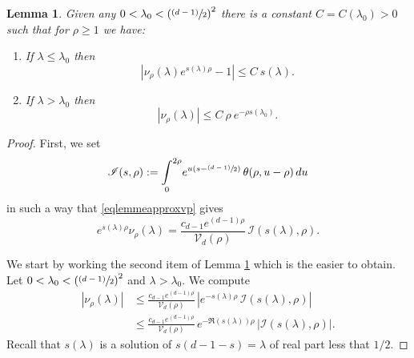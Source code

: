 \documentclass[10pt]{amsart}
\let\mathcal\mathscr
\newcommand{\psfrac}[2]{\sfrac{(#1)}{#2}}
\theoremstyle{plain}
\newtheorem{lemma}[equation]{Lemma}
\theoremstyle{definition}
\newcommand{\inte}[1]{\underset{#1}{\int}}
\begin{document}
\begin{lemma}
\label{lemmeapproxvp}
Given any $ 0 < \lambda_0 < \left(\psfrac{d-1}{2} \right)^2 $ there is a constant $C = C(\lambda_0) > 0$ such that for $\rho \ge 1$ we have:
\begin{enumerate}
\item If $\lambda \le \lambda_0$ then
\[
| \nu_{\rho}(\lambda) e^{s(\lambda) \rho} - 1 | \le C \ s(\lambda).
\]
\item If $\lambda > \lambda_0$ then
\[
|\nu_{\rho}(\lambda)| \le C \ \rho \ e^{- \rho s(\lambda_0)}.
\]
\end{enumerate}
\end{lemma}

\begin{proof}
First, we set
\[
\mathcal{I}(s,\rho) := \inte{0}^{2\rho} e^{u \left(s - \psfrac{d-1}{2} \right)}\, \theta(\rho, u-\rho) \,du
\]
in such a way that \eqref{eqlemmeapproxvp} gives
\[
e^{s(\lambda) \rho} \nu_{\rho}(\lambda) = \frac{ c_{d-1} e^{(d-1)\rho}} {\mathcal{V}_d(\rho)} \, \mathcal{I}(s(\lambda),\rho).
\]

We start by working the second item of Lemma \ref{lemmeapproxvp} which is the easier to obtain. Let $ 0 < \lambda_0 < \left(\psfrac{d-1}{2} \right)^2 $ and $\lambda > \lambda_0$. We compute
\begin{align*}
|\nu_{\rho}(\lambda)| & \le \frac{c_{d-1} e^{(d-1)\rho}}{\mathcal{V}_d(\rho)}\, | e^{ - s(\lambda) \rho } \, \mathcal{I}(s(\lambda),\rho) | \\
& \le \frac{c_{d-1} e^{(d-1)\rho}}{\mathcal{V}_d(\rho)}\, e^{ - \Re(s(\lambda)) \rho } \, | \mathcal{I}(s(\lambda),\rho) |.
\end{align*}
Recall that $s(\lambda)$ is a solution of $s(d-1 -s) = \lambda$ of real part less that $1/2$.


\end{proof}
\end{document}
